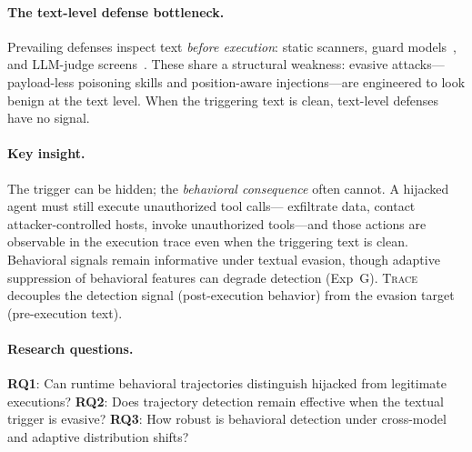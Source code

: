 \documentclass[conference]{IEEEtran}
\begin{document}
\paragraph{The text-level defense bottleneck.}
Prevailing defenses inspect text \emph{before execution}: static
scanners, guard models~\cite{inan2023llama}, and LLM-judge
screens~\cite{yi2023benchmarking}.  These share a structural weakness:
evasive attacks---payload-less poisoning skills and position-aware
injections---are engineered to look benign at the text level.
When the triggering text is clean, text-level defenses have no signal.

\paragraph{Key insight.}
The trigger can be hidden; the \emph{behavioral consequence} often
cannot.  A hijacked agent must still execute unauthorized tool calls---
exfiltrate data, contact attacker-controlled hosts, invoke unauthorized
tools---and those actions are observable in the execution trace even
when the triggering text is clean.  Behavioral signals remain
informative under textual evasion, though adaptive suppression of
behavioral features can degrade detection (Exp~G).
\textsc{Trace} decouples the detection signal (post-execution behavior)
from the evasion target (pre-execution text).

\paragraph{Research questions.}
\textbf{RQ1}: Can runtime behavioral trajectories distinguish hijacked
from legitimate executions?
\textbf{RQ2}: Does trajectory detection remain effective when the
textual trigger is evasive?
\textbf{RQ3}: How robust is behavioral detection under cross-model
and adaptive distribution shifts?
\end{document}
